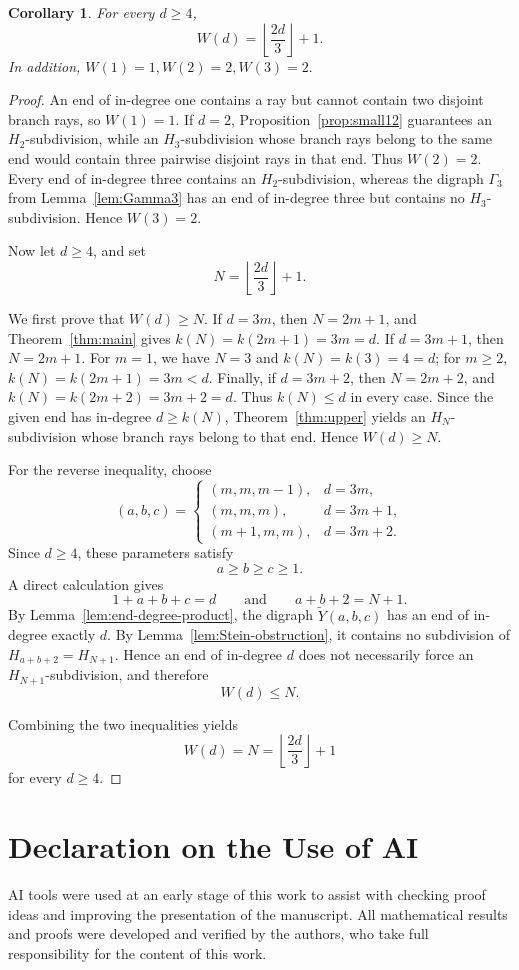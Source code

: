 \documentclass[11pt]{article}
\newtheorem{corollary}[theorem]{Corollary}
\theoremstyle{remark}
\numberwithin{equation}{section}
\begin{document}
\begin{corollary}\label{width correspondence}
For every \(d\ge 4\),
\[
W(d)=\left\lfloor\frac{2d}{3}\right\rfloor+1.
\]
In addition, $W(1)=1, W(2)=2, W(3)=2.$
\end{corollary}

\begin{proof}
An end of in-degree one contains a ray but cannot contain two disjoint branch rays, so $W(1)=1$. If $d=2$, Proposition~\ref{prop:small12} guarantees an $H_2$-subdivision, while an $H_3$-subdivision whose branch rays belong to the same end would contain three pairwise disjoint rays in that end. Thus $W(2)=2$. Every end of in-degree three contains an $H_2$-subdivision, whereas the digraph \(\Gamma_3\) from Lemma~\ref{lem:Gamma3} has an end of in-degree three but contains no $H_3$-subdivision. Hence $W(3)=2$.

Now let \(d\ge 4\), and set
\[
N=\left\lfloor\frac{2d}{3}\right\rfloor+1.
\]

We first prove that \(W(d)\ge N\).
If $d=3m$, then $N=2m+1$, and Theorem~\ref{thm:main} gives $k(N)=k(2m+1)=3m=d.$
If $d=3m+1$, then $N=2m+1$. For $m=1$, we have $N=3$ and $k(N)=k(3)=4=d$; for $m\ge2$, $k(N)=k(2m+1)=3m<d.$
Finally, if $d=3m+2$, then $N=2m+2$, and $k(N)=k(2m+2)=3m+2=d.$ Thus $k(N)\le d$ in every case. Since the given end has in-degree $d\ge k(N)$, Theorem~\ref{thm:upper} yields an $H_N$-subdivision whose branch rays belong to that end. Hence $W(d)\ge N$.

For the reverse inequality, choose
\[
(a,b,c)=
\begin{cases}
(m,m,m-1), & d=3m,\\
(m,m,m),   & d=3m+1,\\
(m+1,m,m), & d=3m+2.
\end{cases}
\]
Since $d\geq 4$, these parameters satisfy
\[
a\ge b\ge c\ge1.
\]
A direct calculation gives
\[
1+a+b+c=d
\qquad\text{and}\qquad
a+b+2=N+1.
\]
By Lemma~\ref{lem:end-degree-product}, the digraph \(\widetilde{Y}(a,b,c)\) has an end of in-degree exactly $d$. By Lemma~\ref{lem:Stein-obstruction}, it contains no subdivision of $H_{a+b+2}=H_{N+1}.$
Hence an end of in-degree $d$ does not necessarily force an $H_{N+1}$-subdivision, and therefore
\[
W(d)\le N.
\]

Combining the two inequalities yields
\[
W(d)=N=\left\lfloor\frac{2d}{3}\right\rfloor+1
\]
for every \(d\ge4\).
\end{proof}

\section*{Declaration on the Use of AI}
AI tools were used at an early stage of this work to assist with checking proof ideas and improving the presentation of the manuscript. All mathematical results and proofs were developed and verified by the authors, who take full responsibility for the content of this work.
\end{document}
